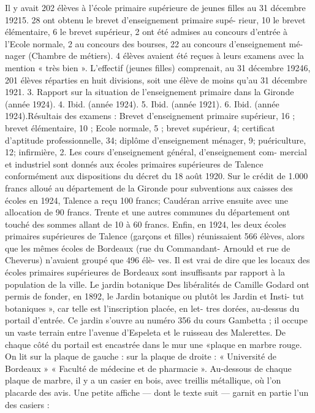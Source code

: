 \documentclass[a4paper,11pt]{book}
\begin{document}
Il y avait 202 élèves à l'école primaire supérieure de
jeunes filles au 31 décembre 19215.
28 ont obtenu le brevet d'enseignement primaire supé-
rieur, 10 le brevet élémentaire, 6 le brevet supérieur, 2 ont
été admises au concours d'entrée à l'Ecole normale, 2 au
concours des bourses, 22 au concours d'enseignement mé-
nager (Chambre de métiers).
4 élèves avaient été reçues à leurs examens avec la
mention « très bien ».
L'effectif (jeunes filles) comprenait, au 31 décembre
19246, 201 élèves réparties en huit divisions, soit une élève
de moins qu'au 31 décembre 1921.
3. Rapport sur la situation de l'enseignement primaire dans la Gironde
(année 1924).
4. Ibid. (année 1924).
5. Ibid. (année 1921).
6. Ibid. (année 1924).Résultais des examens : Brevet d'enseignement primaire
supérieur, 16 ; brevet élémentaire, 10 ; Ecole normale, 5 ;
brevet supérieur, 4; certificat d'aptitude professionnelle,
34; diplôme d'enseignement ménager, 9; puériculture, 12;
infirmière, 2.
Les cours d'enseignement général, d'enseignement com-
mercial et industriel sont donnés aux écoles primaires
supérieures de Talence conformément aux dispositions du
décret du 18 août 1920.
Sur le crédit de 1.000 francs alloué au département de
la Gironde pour subventions aux caisses des écoles en
1924, Talence a reçu 100 francs; Caudéran arrive ensuite
avec une allocation de 90 francs. Trente et une autres
communes du département ont touché des sommes allant
de 10 à 60 francs.
Enfin, en 1924, les deux écoles primaires supérieures de
Talence (garçons et filles) réunissaient 566 élèves, alors
que les mêmes écoles de Bordeaux (rue du Commandant-
Arnould et rue de Cheverus) n'avaient groupé que 496 élè-
ves. Il est vrai de dire que les locaux des écoles primaires
supérieures de Bordeaux sont insuffisants par rapport à
la population de la ville.
Le jardin botanique
Des libéralités de Camille Godard ont permis de fonder,
en 1892, le Jardin botanique ou plutôt les Jardin et Insti-
tut botaniques », car telle est l'inscription placée, en let-
tres dorées, au-dessus du portail d'entrée.
Ce jardin s'ouvre au numéro 356 du cours Gambetta ;
il occupe un vaste terrain entre l'avenue d'Espeleta et le
ruisseau des Malerettes.
De chaque côté du portail est encastrée dans le mur une
«plaque en marbre rouge. On lit sur la plaque de gauche :
sur la plaque de droite :
« Université de Bordeaux »
« Faculté de médecine et de pharmacie ».
Au-dessous de chaque plaque de marbre, il y a un casier
en bois, avec treillis métallique, où l'on placarde des avis.
Une petite affiche — dont le texte suit — garnit en partie
l'un des casiers :
\end{document}
